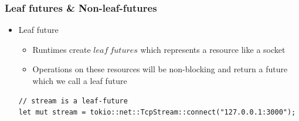 \begin{frame}[fragile]
    \frametitle{Leaf futures \& Non-leaf-futures}
% 
% 
% 
    \begin{itemize}
        \item Leaf future
    	\begin{itemize}
    	    \item Runtimes create \(leaf\ futures\) which represents a resource like a socket
    	    \item Operations on these resources will be non-blocking and return a future which we call a leaf future
    	\end{itemize}
\begin{block}{}
\begin{verbatim}
// stream is a leaf-future
let mut stream = tokio::net::TcpStream::connect("127.0.0.1:3000");
\end{verbatim}
\end{block}

\end{itemize}
% 
\end{frame}



